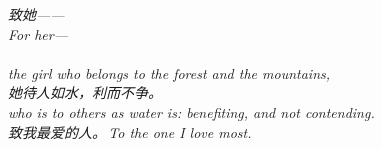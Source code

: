 
\begin{abstract}

\end{abstract}
\clearpage

\thispagestyle{empty}
\null\vfill
\begin{center}
\begin{minipage}{0.74\linewidth}
\centering\itshape\color{rose}
{\cjk 致她——}\\[0.3em]
For her---\\[0.7em]
\\[0.2em]
the girl who belongs to the forest and the mountains,\\[0.5em]
{\cjk 她待人如水，利而不争。}\\[0.2em]
who is to others as water is: benefiting, and not contending.\\[1.0em]
{\upshape\footnotesize\color{gold} {\cjk 致我最爱的人。}\,\;To the one I love most.}
\end{minipage}
\end{center}
\vfill\null
\clearpage


